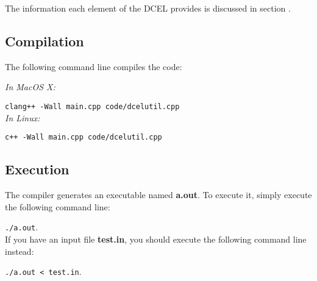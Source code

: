\documentclass[12pt,a4paper,oneside]{article}
\begin{document}
The information each element of the DCEL provides is discussed in section . %

\subsection{Compilation}\label{subsec:compile}

The following command line compiles the code:

\textit{In MacOS X:}

\texttt{clang++ -Wall main.cpp code/dcelutil.cpp}\\

\textit{In Linux:}

\texttt{c++ -Wall main.cpp code/dcelutil.cpp}

\subsection{Execution}

The compiler generates an executable named \textbf{a.out}. To execute it, simply execute the following command line:

\texttt{./a.out}.\\

If you have an input file \textbf{test.in}, you should execute the following command line instead:

\texttt{./a.out < test.in}.












\end{document}
